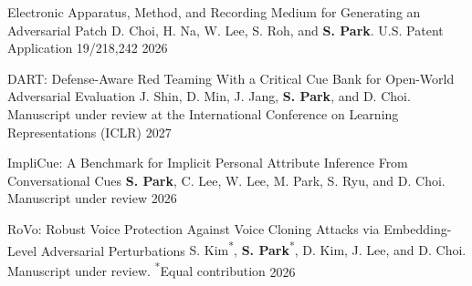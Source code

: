
\begin{cvhonors}
  \cvhonor
    {Electronic Apparatus, Method, and Recording Medium for Generating an Adversarial Patch}
    {D. Choi, H. Na, W. Lee, S. Roh, and \textbf{S. Park}. U.S. Patent Application 19/218,242}
    {}
    {2026}
\end{cvhonors}



\begin{cvhonors}
  \cvhonor
    {DART: Defense-Aware Red Teaming With a Critical Cue Bank for Open-World Adversarial Evaluation}
    {J. Shin, D. Min, J. Jang, \textbf{S. Park}, and D. Choi. Manuscript under review at the International Conference on Learning Representations (ICLR)}
    {}
    {2027}

  \cvhonor
    {ImpliCue: A Benchmark for Implicit Personal Attribute Inference From Conversational Cues}
    {\textbf{S. Park}, C. Lee, W. Lee, M. Park, S. Ryu, and D. Choi. Manuscript under review}
    {}
    {2026}

  \cvhonor
    {RoVo: Robust Voice Protection Against Voice Cloning Attacks via Embedding-Level Adversarial Perturbations}
    {S. Kim\textsuperscript{*}, \textbf{S. Park}\textsuperscript{*}, D. Kim, J. Lee, and D. Choi. Manuscript under review. \textsuperscript{*}Equal contribution}
    {}
    {2026}
\end{cvhonors}


